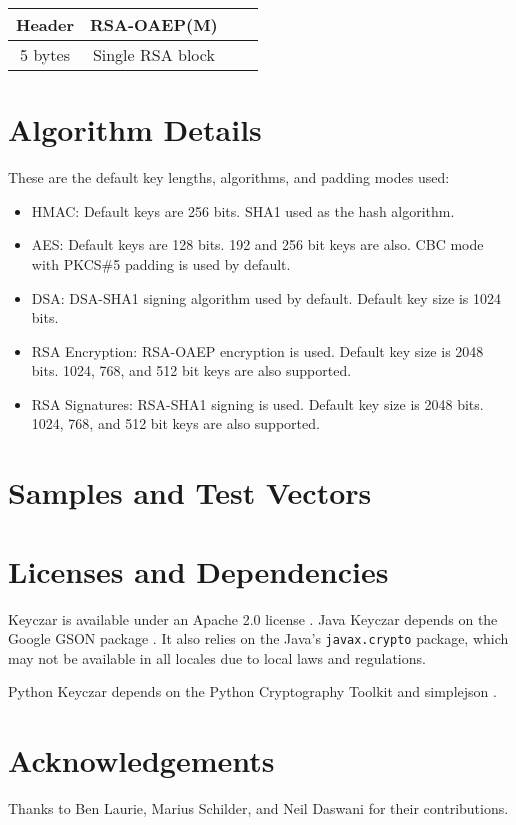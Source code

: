 \documentclass{llncs}
\begin{document}
\begin{tabular}{| c | c | c | c |}
\hline
Header & RSA-OAEP(M)  \\ \hline
5 bytes & Single RSA block  \\
\hline
\end{tabular}


\section{Algorithm Details}

These are the default key lengths, algorithms, and padding modes used:

\begin{itemize}
  \item HMAC: Default keys are 256 bits. SHA1 used as the hash
  algorithm.
  \item AES: Default keys are 128 bits. 192 and 256 bit keys are also. CBC mode
  with PKCS\#5 padding is used by default.
  \item DSA: DSA-SHA1 signing algorithm used by default. Default key size is
  1024 bits.
  \item RSA Encryption: RSA-OAEP encryption is used. Default key size is 2048
  bits. 1024, 768, and 512 bit keys are also supported.
  \item RSA Signatures: RSA-SHA1 signing is used. Default key size is 2048
  bits. 1024, 768, and 512 bit keys are also supported.
\end{itemize}


\section{Samples and Test Vectors}

\section{Licenses and Dependencies}

Keyczar is available under an Apache 2.0 license \cite{apache2}. Java Keyczar
depends on the Google GSON package \cite{google-gson}. It also relies on the
Java's {\tt javax.crypto} package, which may not be available in  all locales
due to local laws and regulations.

Python Keyczar depends on the Python Cryptography Toolkit \cite{python-crypto}
and simplejson \cite{simplejson}. 

\section{Acknowledgements}

Thanks to Ben Laurie, Marius Schilder, and Neil Daswani for their
contributions.



\end{document}
